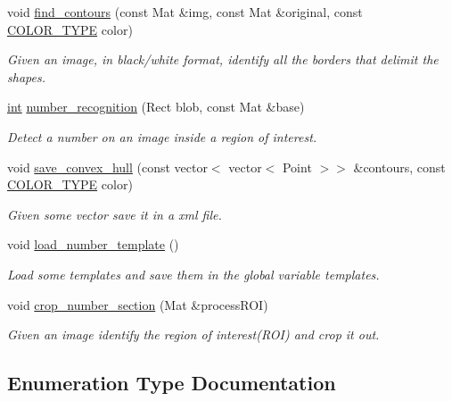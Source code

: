 \begin{DoxyCompactItemize}
void \mbox{\hyperlink{detection_8hh_a26fa1540618b22726a42c239030662b4}{find\+\_\+contours}} (const Mat \&img, const Mat \&original, const \mbox{\hyperlink{detection_8hh_aef17e8300db831cb13df4975928a52cb}{C\+O\+L\+O\+R\+\_\+\+T\+Y\+PE}} color)
\begin{DoxyCompactList}\small\item\em Given an image, in black/white format, identify all the borders that delimit the shapes. \end{DoxyCompactList}\item 
\mbox{\hyperlink{draw_8hh_aa620a13339ac3a1177c86edc549fda9b}{int}} \mbox{\hyperlink{detection_8hh_a785fcf35ca81d113a1ea3d831fbdbc22}{number\+\_\+recognition}} (Rect blob, const Mat \&base)
\begin{DoxyCompactList}\small\item\em Detect a number on an image inside a region of interest. \end{DoxyCompactList}\item 
void \mbox{\hyperlink{detection_8hh_a79a1c18ddf68e72685d61376ff24948b}{save\+\_\+convex\+\_\+hull}} (const vector$<$ vector$<$ Point $>$$>$ \&contours, const \mbox{\hyperlink{detection_8hh_aef17e8300db831cb13df4975928a52cb}{C\+O\+L\+O\+R\+\_\+\+T\+Y\+PE}} color)
\begin{DoxyCompactList}\small\item\em Given some vector save it in a xml file. \end{DoxyCompactList}\item 
void \mbox{\hyperlink{detection_8hh_a50993b0aa4f01d89a4e5d0aef4e1e5f4}{load\+\_\+number\+\_\+template}} ()
\begin{DoxyCompactList}\small\item\em Load some templates and save them in the global variable \textquotesingle{}templates\textquotesingle{}. \end{DoxyCompactList}\item 
void \mbox{\hyperlink{detection_8hh_a8edaf0da54add7cd1461bafecef26b56}{crop\+\_\+number\+\_\+section}} (Mat \&process\+R\+OI)
\begin{DoxyCompactList}\small\item\em Given an image identify the region of interest(\+R\+O\+I) and crop it out. \end{DoxyCompactList}\end{DoxyCompactItemize}


\subsection{Enumeration Type Documentation}
\mbox{\label{detection_8hh_aef17e8300db831cb13df4975928a52cb}} 
